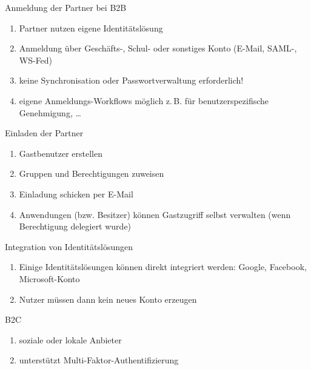 \begin{flashcard}[Definition]{Anmeldung der Partner bei B2B}
  \begin{enumerate}
    \item Partner nutzen eigene Identitätslösung
    \item Anmeldung über Geschäfts-, Schul- oder sonstiges Konto\newline
    (E-Mail, SAML-, WS-Fed)
    \item keine Synchronisation oder Passwortverwaltung erforderlich!
    \item eigene Anmeldungs-Workflows möglich\newline
      z.\,B. für benutzerspezifische Genehmigung, \ldots
  \end{enumerate}
\end{flashcard}

\begin{flashcard}[Definition]{Einladen der Partner}
  \begin{enumerate}
    \item Gastbenutzer erstellen
    \item Gruppen und Berechtigungen zuweisen
    \item Einladung schicken per E-Mail
    \item Anwendungen (bzw. Besitzer) können Gastzugriff selbst verwalten\newline
    (wenn Berechtigung delegiert wurde)
  \end{enumerate}
\end{flashcard}

\begin{flashcard}[Definition]{Integration von Identitätslösungen}
  \begin{enumerate}
    \item Einige Identitätslösungen können direkt integriert werden:\newline
    Google, Facebook, Microsoft-Konto
    \item Nutzer müssen dann kein neues Konto erzeugen
  \end{enumerate}
\end{flashcard}

\begin{flashcard}[]{B2C}
  \begin{enumerate}
    \item soziale oder lokale Anbieter
    \item unterstützt Multi-Faktor-Authentifizierung
  \end{enumerate}
\end{flashcard}
